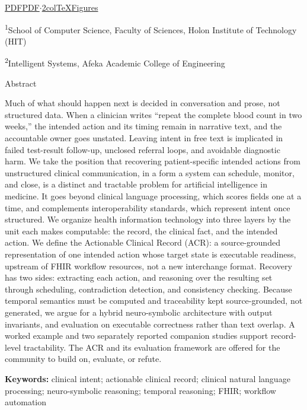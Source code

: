 \href{three-generations-healthcare-it_AIIM.pdf}{PDF}{\textbar{}}\href{three-generations-healthcare-it_AIIM_2col.pdf}{PDF$\cdot$2col}{\textbar{}}\href{three-generations-healthcare-it_AIIM_2col.tex}{TeX}{\textbar{}}{\textbar{}}\href{figures.html}{Figures}

\textsuperscript{1}School of Computer Science, Faculty of Sciences, Holon Institute of Technology (HIT)

\textsuperscript{2}Intelligent Systems, Afeka Academic College of Engineering

{Abstract}

Much of what should happen next is decided in conversation and prose, not structured data. When a clinician writes ``repeat the complete blood count in two weeks,'' the intended action and its timing remain in narrative text, and the accountable owner goes unstated. Leaving intent in free text is implicated in failed test-result follow-up, unclosed referral loops, and avoidable diagnostic harm. We take the position that recovering patient-specific intended actions from unstructured clinical communication, in a form a system can schedule, monitor, and close, is a distinct and tractable problem for artificial intelligence in medicine. It goes beyond clinical language processing, which scores fields one at a time, and complements interoperability standards, which represent intent once structured. We organize health information technology into three layers by the unit each makes computable: the record, the clinical fact, and the intended action. We define the Actionable Clinical Record (ACR): a source-grounded representation of one intended action whose target state is executable readiness, upstream of FHIR workflow resources, not a new interchange format. Recovery has two sides: extracting each action, and reasoning over the resulting set through scheduling, contradiction detection, and consistency checking. Because temporal semantics must be computed and traceability kept source-grounded, not generated, we argue for a hybrid neuro-symbolic architecture with output invariants, and evaluation on executable correctness rather than text overlap. A worked example and two separately reported companion studies support record-level tractability. The ACR and its evaluation framework are offered for the community to build on, evaluate, or refute.

\textbf{Keywords:} clinical intent; actionable clinical record; clinical natural language processing; neuro-symbolic reasoning; temporal reasoning; FHIR; workflow automation

